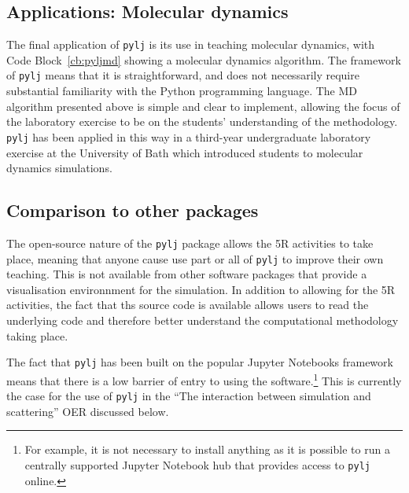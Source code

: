 \subsection{Applications: Molecular dynamics}
The final application of \texttt{pylj} is its use in teaching molecular dynamics, with Code Block~\ref{cb:pyljmd} showing a molecular dynamics algorithm.
The framework of \texttt{pylj} means that it is straightforward, and does not necessarily require substantial familiarity with the Python programming language.
The MD algorithm presented above is simple and clear to implement, allowing the focus of the laboratory exercise to be on the students' understanding of the methodology.
\texttt{pylj} has been applied in this way in a third-year undergraduate laboratory exercise at the University of Bath which introduced students to molecular dynamics simulations.

\subsection{Comparison to other packages}
The open-source nature of the \texttt{pylj} package allows the 5R activities to take place, meaning that anyone cause use part or all of \texttt{pylj} to improve their own teaching.
This is not available from other software packages that provide a visualisation environnment for the simulation.
In addition to allowing for the 5R activities, the fact that ths source code is available allows users to read the underlying code and therefore better understand the computational methodology taking place.

The fact that \texttt{pylj} has been built on the popular Jupyter Notebooks framework means that there is a low barrier of entry to using the software.\footnote{For example, it is not necessary to install anything as it is possible to run a centrally supported Jupyter Notebook hub that provides access to \texttt{pylj} online.}
This is currently the case for the use of \texttt{pylj} in the ``The interaction between simulation and scattering'' OER discussed below.
